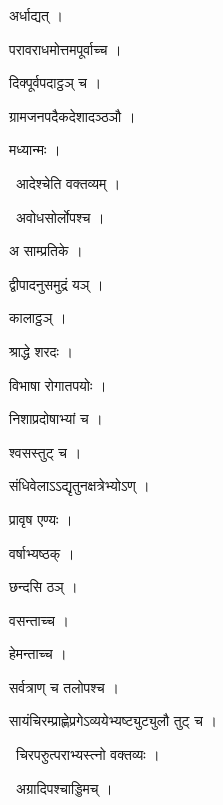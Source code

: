 \documentclass[10pt, openany, oneside]{book}
\begin{document}
\noindent अर्धाद्यत् ।

\noindent परावराधमोत्तमपूर्वाच्च ।

\noindent दिक्पूर्वपदाट्ठञ् च ।

\noindent ग्रामजनपदैकदेशादञ्ठञौ ।

\noindent मध्यान्मः ।

\par\noindent\hspace{1.5em}{\vps वा॰}~{\qt आदेश्चेति वक्तव्यम् ।}

\par\noindent\hspace{1.5em}{\vps वा॰}~{\qt अवोधसोर्लोपश्च ।}

\noindent अ साम्प्रतिके ।

\noindent द्वीपादनुसमुद्रं यञ् ।

\noindent कालाट्ठञ् ।

\noindent श्राद्धे शरदः ।

\noindent विभाषा रोगातपयोः ।

\noindent निशाप्रदोषाभ्यां च ।

\noindent श्वसस्तुट् च ।

\noindent संधिवेलाऽऽद्यृतुनक्षत्रेभ्योऽण् ।

\noindent प्रावृष एण्यः ।

\noindent वर्षाभ्यष्ठक् ।

\noindent छन्दसि ठञ् ।

\noindent वसन्ताच्च ।

\noindent हेमन्ताच्च ।

\noindent सर्वत्राण् च तलोपश्च ।

\noindent सायंचिरम्प्राह्णेप्रगेऽव्ययेभ्यष्ट्युट्युलौ तुट् च ।

\par\noindent\hspace{1.5em}{\vps वा॰}~{\qt चिरपरुुत्पराभ्यस्त्नो वक्तव्यः ।}

\par\noindent\hspace{1.5em}{\vps वा॰}~{\qt अग्रादिपश्चाड्डिमच् ।}
\end{document}
